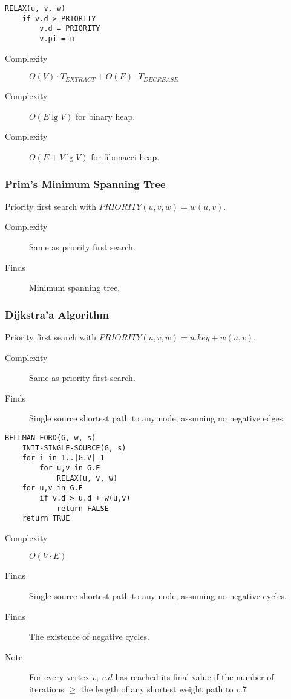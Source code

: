 \documentclass[10pt, a4paper,landscape]{article}
\begin{document}
\begin{multicols*}{4}
\begin{lstlisting}
RELAX(u, v, w)
    if v.d > PRIORITY
        v.d = PRIORITY
        v.pi = u
\end{lstlisting}
\begin{description}
    \item[Complexity] $\Theta(V)\cdot T_{EXTRACT} + \Theta(E)\cdot T_{DECREASE}$
    \item[Complexity] $O(E\lg{V})$ for binary heap.
    \item[Complexity] $O(E + V\lg{V})$ for fibonacci heap.
\end{description}

\subsubsection{Prim's Minimum Spanning Tree}
Priority first search with $PRIORITY(u, v, w) = w(u, v)$.
\begin{description}
    \item[Complexity] Same as priority first search.
    \item[Finds] Minimum spanning tree.
\end{description}

\subsubsection{Dijkstra'a Algorithm}
Priority first search with $PRIORITY(u, v, w) = u.key + w(u, v)$.
\begin{description}
    \item[Complexity] Same as priority first search.
    \item[Finds] Single source shortest path to any node, assuming no negative edges.
\end{description}

\begin{lstlisting}
BELLMAN-FORD(G, w, s)
    INIT-SINGLE-SOURCE(G, s)
    for i in 1..|G.V|-1
        for u,v in G.E
            RELAX(u, v, w)
    for u,v in G.E
        if v.d > u.d + w(u,v)
            return FALSE
    return TRUE
\end{lstlisting}

\begin{description}
    \item[Complexity] $O(V\cdot E)$
    \item[Finds] Single source shortest path to any node, assuming no negative cycles.
    \item[Finds] The existence of negative cycles.
    \item[Note] For every vertex $v$, $v.d$ has reached its final value if the number of iterations $\geq$ the length of any shortest weight path to $v$.7
\end{description}


\end{multicols*}
\end{document}
